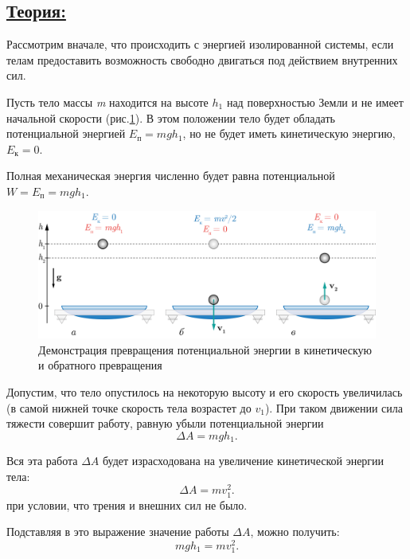\documentclass[14pt,a4paper,oneside]{extarticle}	%
\begin{document}
\subsection*{\underline{Теория:}}

Рассмотрим вначале, что происходить с энергией изолированной системы, если телам предоставить возможность свободно двигаться под действием внутренних сил. 

Пусть тело массы \textit{m} находится на высоте $ h_1 $ над поверхностью 
Земли и не имеет начальной скорости (рис.\ref{transform-3}). 
В этом положении тело будет обладать потенциальной энергией $ E_\text{п}=mgh_1 $, но не будет иметь кинетическую энергию, $ E_\text{к}=0 $. 

Полная механическая энергия численно будет равна потенциальной $W = E_\text{п} =mgh_1$.

\begin{figure}[H] 
	\centering 	
	\includegraphics[width=0.9\linewidth]{transform-3.png}
	\caption{Демонстрация превращения потенциальной энергии в кинетическую и обратного превращения}
	\label{transform-3}
\end{figure}

Допустим, что тело опустилось на некоторую высоту и его скорость увеличилась (в самой нижней точке скорость тела возрастет до $ v_1 $).
При таком движении сила тяжести совершит работу, равную убыли потенциальной энергии
\begin{equation}
\Delta A=mgh_1.
\end{equation}

Вся эта работа $ \Delta A  $ будет израсходована на увеличение кинетической энергии тела: 
\begin{equation}
\Delta A=mv_1^2.
\end{equation}
при условии, что трения и внешних сил не было. 

Подставляя в это выражение значение работы $ \Delta A $, можно получить: 
\begin{equation}
mgh_1=mv_1^2.
\end{equation}
\end{document}
